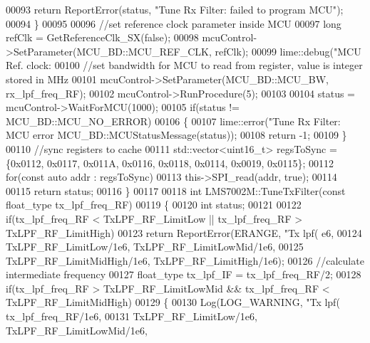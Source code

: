 \begin{DoxyCode}
{00093             \textcolor{keywordflow}{return} ReportError(status, \textcolor{stringliteral}{"Tune Rx Filter: failed to program MCU"});
00094     \}
00095 
00096     \textcolor{comment}{//set reference clock parameter inside MCU}
00097     \textcolor{keywordtype}{long} refClk = GetReferenceClk_SX(\textcolor{keyword}{false});
00098     mcuControl->SetParameter(MCU_BD::MCU_REF_CLK, refClk);
00099     lime::debug(\textcolor{stringliteral}{"MCU Ref. clock: %
00100     \textcolor{comment}{//set bandwidth for MCU to read from register, value is integer stored in MHz}
00101     mcuControl->SetParameter(MCU_BD::MCU_BW, rx\_lpf\_freq\_RF);
00102     mcuControl->RunProcedure(5);
00103 
00104     status = mcuControl->WaitForMCU(1000);
00105     \textcolor{keywordflow}{if}(status != MCU_BD::MCU_NO_ERROR)
00106     \{
00107         lime::error(\textcolor{stringliteral}{"Tune Rx Filter: MCU error %
      MCU_BD::MCUStatusMessage(status));
00108         \textcolor{keywordflow}{return} -1;
00109     \}
00110     \textcolor{comment}{//sync registers to cache}
00111     std::vector<uint16\_t> regsToSync = \{0x0112, 0x0117, 0x011A, 0x0116, 0x0118, 0x0114, 0x0019, 0x0115\};
00112     \textcolor{keywordflow}{for}(\textcolor{keyword}{const} \textcolor{keyword}{auto} addr : regsToSync)
00113         this->SPI_read(addr, \textcolor{keyword}{true});
00114 
00115     \textcolor{keywordflow}{return} status;
00116 \}
00117 
00118 \textcolor{keywordtype}{int} LMS7002M::TuneTxFilter(\textcolor{keyword}{const} float_type tx\_lpf\_freq\_RF)
00119 \{
00120     \textcolor{keywordtype}{int} status;
00121 
00122     \textcolor{keywordflow}{if}(tx\_lpf\_freq\_RF < TxLPF\_RF\_LimitLow || tx\_lpf\_freq\_RF > TxLPF_RF_LimitHigh)
00123         \textcolor{keywordflow}{return} ReportError(ERANGE, \textcolor{stringliteral}{"Tx lpf(%
      e6,
00124                         TxLPF_RF_LimitLow/1e6, TxLPF_RF_LimitLowMid/1e6,
00125                         TxLPF_RF_LimitMidHigh/1e6, TxLPF\_RF\_LimitHigh/1e6);
00126     \textcolor{comment}{//calculate intermediate frequency}
00127     float_type tx\_lpf\_IF = tx\_lpf\_freq\_RF/2;
00128     \textcolor{keywordflow}{if}(tx\_lpf\_freq\_RF > TxLPF_RF_LimitLowMid && tx\_lpf\_freq\_RF < 
      TxLPF_RF_LimitMidHigh)
00129     \{
00130         Log(LOG_WARNING, \textcolor{stringliteral}{"Tx lpf(%
      tx\_lpf\_freq\_RF/1e6,
00131                         TxLPF_RF_LimitLow/1e6, TxLPF_RF_LimitLowMid/1e6,
}}}}}
\end{DoxyCode}
